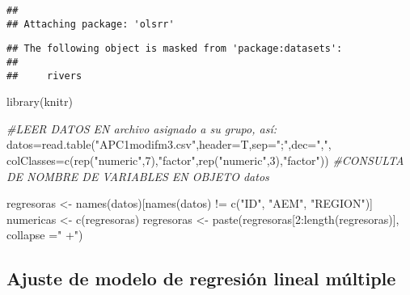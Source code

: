 \documentclass[
]{article}
\newenvironment{Shaded}{\begin{snugshade}}{\end{snugshade}}
\newcommand{\AttributeTok}[1]{\textcolor[rgb]{0.77,0.63,0.00}{#1}}
\newcommand{\CommentTok}[1]{\textcolor[rgb]{0.56,0.35,0.01}{\textit{#1}}}
\newcommand{\DecValTok}[1]{\textcolor[rgb]{0.00,0.00,0.81}{#1}}
\newcommand{\FunctionTok}[1]{\textcolor[rgb]{0.00,0.00,0.00}{#1}}
\newcommand{\NormalTok}[1]{#1}
\newcommand{\OtherTok}[1]{\textcolor[rgb]{0.56,0.35,0.01}{#1}}
\newcommand{\SpecialCharTok}[1]{\textcolor[rgb]{0.00,0.00,0.00}{#1}}
\newcommand{\StringTok}[1]{\textcolor[rgb]{0.31,0.60,0.02}{#1}}
\begin{document}
\begin{verbatim}
## 
## Attaching package: 'olsrr'
\end{verbatim}

\begin{verbatim}
## The following object is masked from 'package:datasets':
## 
##     rivers
\end{verbatim}

\begin{Shaded}
\begin{Highlighting}[]
\FunctionTok{library}\NormalTok{(knitr)}
\end{Highlighting}
\end{Shaded}

\begin{Shaded}
\begin{Highlighting}[]
\CommentTok{\#LEER DATOS EN archivo asignado a su grupo, así:}
\NormalTok{datos}\OtherTok{=}\FunctionTok{read.table}\NormalTok{(}\StringTok{"APC1modifm3.csv"}\NormalTok{,}\AttributeTok{header=}\NormalTok{T,}\AttributeTok{sep=}\StringTok{";"}\NormalTok{,}\AttributeTok{dec=}\StringTok{","}\NormalTok{,}
\AttributeTok{colClasses=}\FunctionTok{c}\NormalTok{(}\FunctionTok{rep}\NormalTok{(}\StringTok{"numeric"}\NormalTok{,}\DecValTok{7}\NormalTok{),}\StringTok{"factor"}\NormalTok{,}\FunctionTok{rep}\NormalTok{(}\StringTok{"numeric"}\NormalTok{,}\DecValTok{3}\NormalTok{),}\StringTok{"factor"}\NormalTok{))}
\CommentTok{\#CONSULTA DE NOMBRE DE VARIABLES EN OBJETO datos}
 
\NormalTok{regresoras }\OtherTok{\textless{}{-}} \FunctionTok{names}\NormalTok{(datos)[}\FunctionTok{names}\NormalTok{(datos) }\SpecialCharTok{!=} \FunctionTok{c}\NormalTok{(}\StringTok{"ID"}\NormalTok{, }\StringTok{"AEM"}\NormalTok{, }\StringTok{"REGION"}\NormalTok{)] }
\NormalTok{numericas }\OtherTok{\textless{}{-}} \FunctionTok{c}\NormalTok{(regresoras)}
\NormalTok{regresoras }\OtherTok{\textless{}{-}} \FunctionTok{paste}\NormalTok{(regresoras[}\DecValTok{2}\SpecialCharTok{:}\FunctionTok{length}\NormalTok{(regresoras)], }\AttributeTok{collapse =}\StringTok{" +"}\NormalTok{)}
\end{Highlighting}
\end{Shaded}

\hypertarget{ajuste-de-modelo-de-regresiuxf3n-lineal-muxfaltiple}{%
\subsection{Ajuste de modelo de regresión lineal
múltiple}\label{ajuste-de-modelo-de-regresiuxf3n-lineal-muxfaltiple}}
\end{document}
